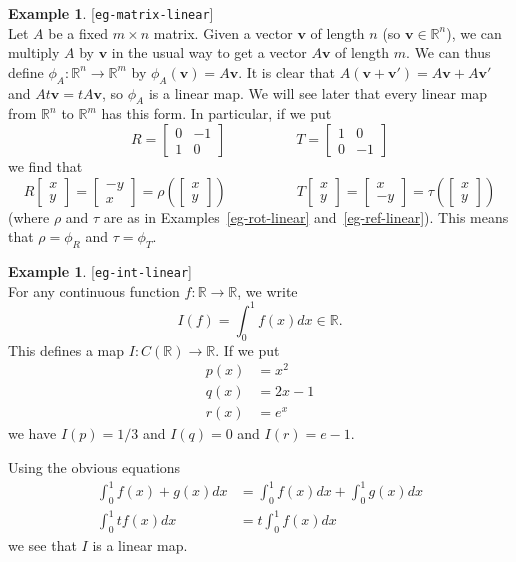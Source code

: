 \documentclass{amsart}
\newcommand{\lbl}[1]{\label{#1}\textup{[\texttt{#1}]}\ \\}
\newcommand{\lbl}{\label}
\newcommand{\R}         {{\mathbb{R}}}
\newcommand{\bsm}       {\left[\begin{smallmatrix}}
\newcommand{\esm}       {\end{smallmatrix}\right]}
\newcommand{\tm}        {\times}
\newcommand{\xra}       {\xrightarrow}
\newcommand{\vv}        {\mathbf{v}}
\renewcommand{\:}       {\colon}
\theoremstyle{definition}
\newtheorem{example}[theorem]{Example}
\begin{document}
\begin{example}\lbl{eg-matrix-linear}
 Let $A$ be a fixed $m\tm n$ matrix.  Given a vector $\vv$
 of length $n$ (so $\vv\in\R^n$), we can multiply $A$ by
 $\vv$ in the usual way to get a vector $A\vv$ of length
 $m$.  We can thus define $\phi_A\:\R^n\xra{}\R^m$ by
 $\phi_A(\vv)=A\vv$.  It is clear that
 $A(\vv+\vv')=A\vv+A\vv'$ and $At\vv=tA\vv$, so $\phi_A$ is
 a linear map.  We will see later that every linear map from
 $\R^n$ to $\R^m$ has this form.  In particular, if we put
 \[ R = \bsm 0 & -1 \\ 1 & 0 \esm \hspace{5em} 
    T = \bsm 1 & 0 \\ 0 & -1 \esm
 \] 
 we find that 
 \[ 
  R\bsm x \\ y\esm = \bsm -y\\ x\esm = 
   \rho\left(\bsm x\\ y\esm\right) \hspace{5em}
  T\bsm x \\ y\esm = \bsm x\\ -y\esm = 
   \tau\left(\bsm x\\ y\esm\right)
 \]
 (where $\rho$ and $\tau$ are as in
 Examples~\ref{eg-rot-linear} and~\ref{eg-ref-linear}).
 This means that $\rho=\phi_R$ and $\tau=\phi_T$.
\end{example}

\begin{example}\lbl{eg-int-linear}
 For any continuous function $f\:\R\xra{}\R$, we write
 \[ I(f) = \int_0^1f(x)dx \in \R. \]
 This defines a map $I\:C(\R)\xra{}\R$.  If we put
 \begin{align*}
   p(x) &= x^2 \\
   q(x) &= 2x-1 \\
   r(x) &= e^x
 \end{align*}
 we have $I(p)=1/3$ and $I(q)=0$ and $I(r)=e-1$.

 Using the obvious equations
 \begin{align*}
   \int_0^1 f(x)+g(x) dx &= \int_0^1 f(x)dx + \int_0^1 g(x) dx \\
   \int_0^1 t f(x) dx &= t \int_0^1 f(x) dx 
 \end{align*}
 we see that $I$ is a linear map.
\end{example}
\end{document}
